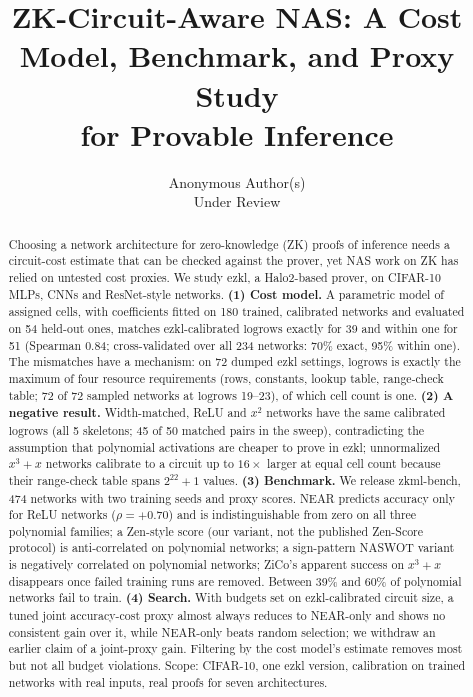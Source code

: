 \documentclass[10pt]{article}
\newcommand{\logrows}{\mathrm{logrows}}
\begin{document}
\title{ZK-Circuit-Aware NAS: A Cost Model, Benchmark, and Proxy Study\\
       for Provable Inference}

\author{%
  Anonymous Author(s)\\
  Under Review
}

\maketitle

\begin{abstract}
Choosing a network architecture for zero-knowledge (ZK) proofs of inference needs a circuit-cost estimate that
can be checked against the prover, yet NAS work on ZK has relied on untested cost proxies.  We study ezkl, a Halo2-based prover, on
CIFAR-10 MLPs, CNNs and ResNet-style networks.  \textbf{(1) Cost model.}  A parametric model of assigned cells, with coefficients fitted on 180 trained, calibrated networks
and evaluated on 54 held-out ones, matches ezkl-calibrated $\logrows$ exactly for 39 and within one for 51
(Spearman 0.84; cross-validated over all 234 networks: 70\% exact, 95\% within one).  The mismatches have a mechanism: on 72 dumped ezkl settings, $\logrows$
is exactly the maximum of four resource requirements (rows, constants, lookup table, range-check table; 72 of 72 sampled networks at $\logrows$ 19--23), of which cell count is one.
\textbf{(2) A negative result.}  Width-matched, ReLU and $x^2$ networks have the same calibrated $\logrows$ (all 5 skeletons; 45 of 50 matched pairs in the sweep), contradicting the assumption
that polynomial activations are cheaper to prove in ezkl; unnormalized $x^3{+}x$ networks calibrate to a circuit up to $16\times$ larger at equal cell count because their range-check table spans $2^{22}+1$ values.
\textbf{(3) Benchmark.}  We release zkml-bench, 474 networks with two training seeds and proxy scores.  NEAR predicts accuracy only for ReLU networks
($\rho=+0.70$) and is indistinguishable from zero on all three polynomial families; a Zen-style score (our variant, not the published Zen-Score protocol) is anti-correlated on polynomial networks; a sign-pattern NASWOT variant is negatively correlated on polynomial networks;
ZiCo's apparent success on $x^3{+}x$ disappears once failed training runs are removed.  Between 39\% and 60\% of polynomial networks fail to train.
\textbf{(4) Search.}  With budgets set on ezkl-calibrated circuit size, a tuned joint accuracy-cost proxy almost always reduces to NEAR-only and shows no consistent gain over it, while NEAR-only beats random selection; we
withdraw an earlier claim of a joint-proxy gain.  Filtering by the cost model's estimate removes most but not all budget violations.
Scope: CIFAR-10, one ezkl version, calibration on trained networks with real inputs, real proofs for seven architectures.
\end{abstract}
\end{document}
